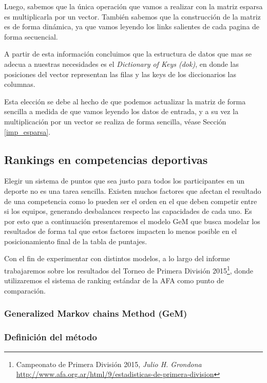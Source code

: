 Luego, sabemos que la única operación que vamos a realizar con la matriz esparsa es multiplicarla por un vector. También sabemos que la
construcción de la matriz es de forma dinámica, ya que vamos leyendo los links salientes de cada pagina de forma secuencial.

A partir de esta información concluimos que la estructura de datos que mas se adecua a nuestras necesidades es el \textit{Dictionary
of Keys (dok)}, en donde las posiciones del vector representan las filas y las keys de los diccionarios las columnas.

Esta elección se debe al hecho de que podemos actualizar la matriz de forma sencilla a medida de que vamos leyendo los datos de entrada, y a su vez
 la multiplicación por un vector se realiza de forma sencilla, véase Sección \ref{imp_esparsa}.

\newpage
\subsection{Rankings en competencias deportivas}\label{rankings_deportivos}

Elegir un sistema de puntos que sea justo para todos los participantes en un
deporte no es una tarea sencilla. Existen muchos factores que afectan el
resultado de una competencia como lo pueden ser el orden en el que deben
competir entre si los equipos, generando desbalances respecto las capacidades de
cada uno. Es por esto que a continuación presentaremos el modelo GeM\cite{Govan2008}
 que busca modelar los resultados de forma tal que estos
factores impacten lo menos posible en el posicionamiento final de la tabla de
puntajes.

Con el fin de experimentar con distintos modelos, a lo largo del informe
trabajaremos sobre los resultados del Torneo de Primera División
2015\footnote{Campeonato de Primera División 2015, \textit{Julio H. Grondona} \\
\url{http://www.afa.org.ar/html/9/estadisticas-de-primera-division}}, donde
utilizaremos el sistema de ranking estándar de la AFA como punto de comparación.

\subsubsection{Generalized Markov chains Method (GeM)}
\label{sec:gem_model}

\subsubsection*{Definición del método}

